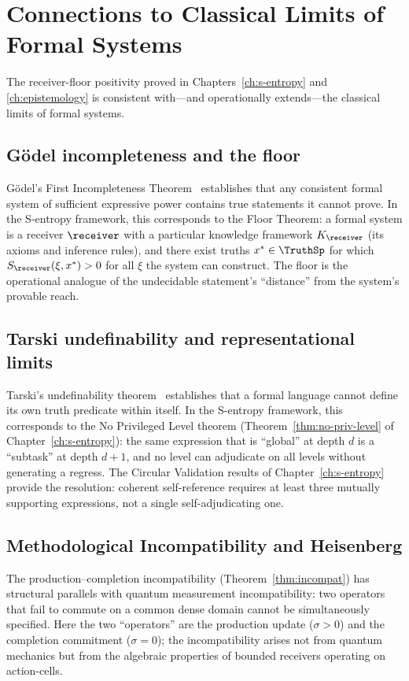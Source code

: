 \section{Connections to Classical Limits of Formal Systems}
\label{sec:classical-limits}

The receiver-floor positivity proved in Chapters~\ref{ch:s-entropy} and \ref{ch:epistemology} is consistent with---and operationally extends---the classical limits of formal systems.

\subsection*{Gödel incompleteness and the floor}
Gödel's First Incompleteness Theorem~\citep{godel1931} establishes that any consistent formal system of sufficient expressive power contains true statements it cannot prove. In the S-entropy framework, this corresponds to the Floor Theorem: a formal system is a receiver $\receiver$ with a particular knowledge framework $K_\receiver$ (its axioms and inference rules), and there exist truths $x^* \in \TruthSp$ for which $S_\receiver(\xi, x^*) > 0$ for all $\xi$ the system can construct. The floor is the operational analogue of the undecidable statement's ``distance'' from the system's provable reach.

\subsection*{Tarski undefinability and representational limits}
Tarski's undefinability theorem~\citep{tarski1933} establishes that a formal language cannot define its own truth predicate within itself. In the S-entropy framework, this corresponds to the No Privileged Level theorem (Theorem~\ref{thm:no-priv-level} of Chapter~\ref{ch:s-entropy}): the same expression that is ``global'' at depth $d$ is a ``subtask'' at depth $d+1$, and no level can adjudicate on all levels without generating a regress. The Circular Validation results of Chapter~\ref{ch:s-entropy} provide the resolution: coherent self-reference requires at least three mutually supporting expressions, not a single self-adjudicating one.

\subsection*{Methodological Incompatibility and Heisenberg}
The production--completion incompatibility (Theorem~\ref{thm:incompat}) has structural parallels with quantum measurement incompatibility: two operators that fail to commute on a common dense domain cannot be simultaneously specified. Here the two ``operators'' are the production update ($\sigma > 0$) and the completion commitment ($\sigma = 0$); the incompatibility arises not from quantum mechanics but from the algebraic properties of bounded receivers operating on action-cells.

